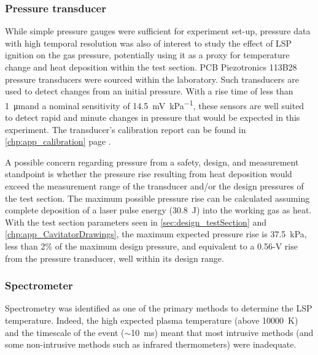             \subsubsection*{Pressure transducer} \label{sec:design_pressuresensor}
                While simple pressure gauges were sufficient for experiment set-up, pressure data with high temporal resolution was also of interest to study the effect of LSP ignition on the gas pressure, potentially using it as a proxy for temperature change and heat deposition within the test section. PCB Piezotronics 113B28 pressure transducers were sourced within the laboratory. Such transducers are used to detect changes from an initial pressure. With a rise time of less than \qty{1}{\um}and a nominal sensitivity of \qty{14.5}{mV.kPa^{-1}}, these sensors are well suited to detect rapid and minute changes in pressure that would be expected in this experiment. The transducer's calibration report can be found in \autoref{chp:app_calibration} page \pageref*{ds:pcbPressure}.

                A possible concern regarding pressure from a safety, design, and measurement standpoint is whether the pressure rise resulting from heat deposition would exceed the measurement range of the transducer and/or the design pressures of the test section. The maximum possible pressure rise can be calculated assuming complete deposition of a laser pulse energy (\qty{30.8}{J}) into the working gas as heat. With the test section parameters seen in \autoref{sec:design_testSection} and \autoref{chp:app_CavitatorDrawings}, the maximum expected pressure rise is \qty{37.5}{kPa}, less than 2\% of the maximum design pressure, and equivalent to a \num{0.56}-\unit{V} rise from the pressure transducer, well within its design range.

            \subsubsection*{Spectrometer}
                Spectrometry was identified as one of the primary methods to determine the LSP temperature. Indeed, the high expected plasma temperature (above \qty{10000}{K}) and the timescale of the event ($\sim$10~ms) meant that most intrusive methods (and some non-intrusive methods such as infrared thermometers) were inadequate.

